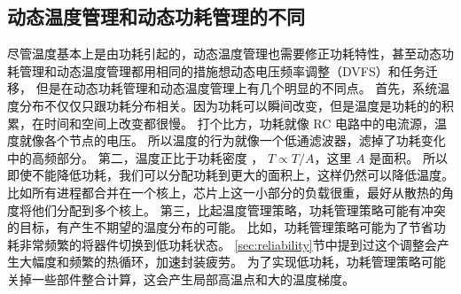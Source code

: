 \subsection{动态温度管理和动态功耗管理的不同}\label{sec:DPM}

尽管温度基本上是由功耗引起的，动态温度管理也需要修正功耗特性，甚至动态功耗管理和动态温度管理都用相同的措施想动态电压频率调整（DVFS）和任务迁移，
但是在动态功耗管理和动态温度管理上有几个明显的不同点。
首先，系统温度分布不仅仅只跟功耗分布相关。因为功耗可以瞬间改变，但是温度是功耗的的积累，在时间和空间上改变都很慢。
打个比方，功耗就像 RC 电路中的电流源，温度就像各个节点的电压。
所以温度的行为就像一个低通滤波器，滤掉了功耗变化中的高频部分。
第二，温度正比于功耗密度 ， $ T \propto T/A$，这里 $A$ 是面积。
所以即使不能降低功耗，我们可以分配功耗到更大的面积上，这样仍然可以降低温度。
比如所有进程都合并在一个核上，芯片上这一小部分的负载很重，最好从散热的角度将他们分配到多个核上。
第三，比起温度管理策略，功耗管理策略可能有冲突的目标，有产生不期望的温度分布的可能。
比如，功耗管理策略可能为了节省功耗非常频繁的将器件切换到低功耗状态。
\ref{sec:reliability}节中提到过这个调整会产生大幅度和频繁的热循环，加速封装疲劳。
为了实现低功耗，功耗管理策略可能关掉一些部件整合计算，这会产生局部高温点和大的温度梯度。





















